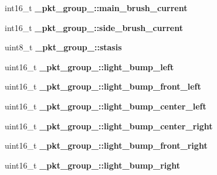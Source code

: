 \begin{DoxyCompactItemize}
\item 
\hypertarget{group__roomba-lib_gaea3fb7ae386d9504d3acfec6aad3f143}{}int16\+\_\+t {\bfseries \+\_\+pkt\+\_\+group\+\_\+::main\+\_\+brush\+\_\+current}\label{group__roomba-lib_gaea3fb7ae386d9504d3acfec6aad3f143}

\item 
\hypertarget{group__roomba-lib_ga50e4c322184f845967d69305a6a86c76}{}int16\+\_\+t {\bfseries \+\_\+pkt\+\_\+group\+\_\+::side\+\_\+brush\+\_\+current}\label{group__roomba-lib_ga50e4c322184f845967d69305a6a86c76}

\item 
\hypertarget{group__roomba-lib_gad676c0f29b774557ad0b4a2164616e5f}{}uint8\+\_\+t {\bfseries \+\_\+pkt\+\_\+group\+\_\+::stasis}\label{group__roomba-lib_gad676c0f29b774557ad0b4a2164616e5f}

\item 
\hypertarget{group__roomba-lib_ga2686ced69a7deee493d3617a7e3f25e9}{}uint16\+\_\+t {\bfseries \+\_\+pkt\+\_\+group\+\_\+::light\+\_\+bump\+\_\+left}\label{group__roomba-lib_ga2686ced69a7deee493d3617a7e3f25e9}

\item 
\hypertarget{group__roomba-lib_ga616ec94b794aef982a6e24e6555fc22c}{}uint16\+\_\+t {\bfseries \+\_\+pkt\+\_\+group\+\_\+::light\+\_\+bump\+\_\+front\+\_\+left}\label{group__roomba-lib_ga616ec94b794aef982a6e24e6555fc22c}

\item 
\hypertarget{group__roomba-lib_ga1a5e8d286ff1759ef39f97b0b16965e3}{}uint16\+\_\+t {\bfseries \+\_\+pkt\+\_\+group\+\_\+::light\+\_\+bump\+\_\+center\+\_\+left}\label{group__roomba-lib_ga1a5e8d286ff1759ef39f97b0b16965e3}

\item 
\hypertarget{group__roomba-lib_ga10a5914d43822355fa6118a4d1a8d389}{}uint16\+\_\+t {\bfseries \+\_\+pkt\+\_\+group\+\_\+::light\+\_\+bump\+\_\+center\+\_\+right}\label{group__roomba-lib_ga10a5914d43822355fa6118a4d1a8d389}

\item 
\hypertarget{group__roomba-lib_gad722687c41c2876edb9be69972c88576}{}uint16\+\_\+t {\bfseries \+\_\+pkt\+\_\+group\+\_\+::light\+\_\+bump\+\_\+front\+\_\+right}\label{group__roomba-lib_gad722687c41c2876edb9be69972c88576}

\item 
\hypertarget{group__roomba-lib_ga2a7b04b214fadc407fcd20a25687227e}{}uint16\+\_\+t {\bfseries \+\_\+pkt\+\_\+group\+\_\+::light\+\_\+bump\+\_\+right}\label{group__roomba-lib_ga2a7b04b214fadc407fcd20a25687227e}


\end{DoxyCompactItemize}
